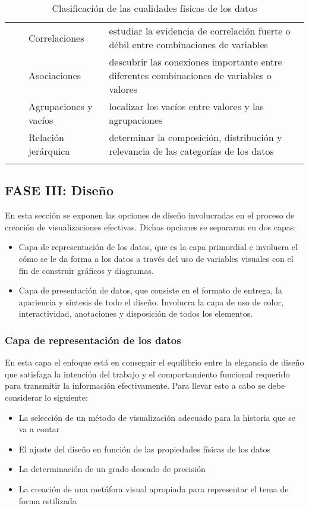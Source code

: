 \begin{landscape}
\begin{longtable}{ | l | l | l | p{10cm} |}
  \cline{3-4}
  &   & Correlaciones & estudiar la evidencia de correlación fuerte o débil entre combinaciones de variables \\
  \cline{3-4}
  &   & Asociaciones & descubrir las conexiones importante entre diferentes combinaciones de variables o valores \\
  \cline{3-4}
  &   & Agrupaciones y vacíos & localizar los vacíos entre valores y las agrupaciones \\
  \cline{3-4}
  &   & Relación jerárquica & determinar la composición, distribución y relevancia de las categorías de los datos \\
  \hline
  \caption[Clasificación de las cualidades físicas de los datos]{Clasificación de las cualidades físicas de los datos}
  \label{table:tb1}
\end{longtable}
\end{landscape}
\subsection{FASE III: Diseño}
En esta sección se exponen las opciones de diseño involucradas en el proceso de creación de visualizaciones efectivas. Dichas opciones se separaran en dos capas:

\begin{itemize}
  \item Capa de representación de los datos, que es la capa primordial e involucra el cómo se le da forma a los datos a través del uso de variables visuales con el fin de construir gráficos y diagramas. 
  \item Capa de presentación de datos, que consiste en el formato de entrega, la apariencia y síntesis de todo el diseño. Involucra la capa de uso de color, interactividad, anotaciones y disposición de todos los elementos.
\end{itemize}

\subsubsection{Capa de representación de los datos}

En esta capa el enfoque está en conseguir el equilibrio entre la elegancia de diseño que satisfaga la intención del trabajo y el comportamiento funcional requerido para transmitir la información efectivamente. Para llevar esto a cabo se debe considerar lo siguiente:

\begin{itemize}
  \item La selección de un método de visualización adecuado para la historia que se va a contar
  \item El ajuste del diseño en función de las propiedades físicas de los datos
  \item La determinación de un grado deseado de precisión
  \item La creación de una metáfora visual apropiada para representar el tema de forma estilizada
\end{itemize}

